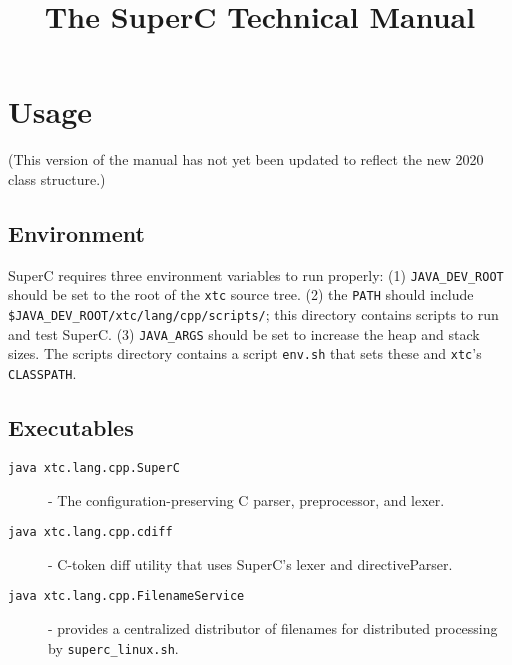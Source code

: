 \documentclass{article}
\newcommand{\SuperC}{{\textsf{Su\-perC}}}
\begin{document}
\title{The \SuperC{} Technical Manual}

\maketitle
\tableofcontents


\section{Usage}

(This version of the manual has not yet been updated to reflect the
new 2020 class structure.)

\subsection{Environment}

SuperC requires three environment variables to run properly: (1)
\verb"JAVA_DEV_ROOT" should be set to the root of the \verb"xtc"
source tree.  (2) the \verb"PATH" should include
\verb"$JAVA_DEV_ROOT/xtc/lang/cpp/scripts/"; this directory contains
scripts to run and test \SuperC{}.  (3) \verb"JAVA_ARGS" should be set
to increase the heap and stack sizes.  The scripts directory contains
a script \verb"env.sh" that sets these and \verb"xtc"'s
\verb"CLASSPATH".

\subsection{Executables}

\begin{description}
\item[\texttt{java xtc.lang.cpp.SuperC}] - The
  configuration-preserving C parser, preprocessor, and lexer.

\item[\texttt{java xtc.lang.cpp.cdiff}] - C-token diff utility that
  uses SuperC's lexer and directiveParser.

\item[\texttt{java xtc.lang.cpp.FilenameService}] - provides a
  centralized distributor of filenames for distributed processing by
  \verb"superc_linux.sh".
\end{description}

\end{document}
